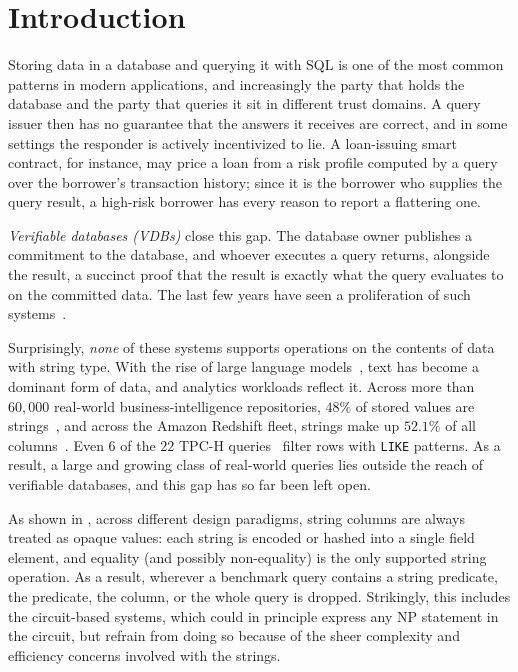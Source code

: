 \doclearpage
\section{Introduction}

Storing data in a database and querying it with SQL is one of the most common patterns in modern applications, and increasingly the party that holds the database and the party that queries it sit in different trust domains. A query issuer then has no guarantee that the answers it receives are correct, and in some settings the responder is actively incentivized to lie. A loan-issuing smart contract, for instance, may price a loan from a risk profile computed by a query over the borrower's transaction history; since it is the borrower who supplies the query result, a high-risk borrower has every reason to report a flattering one.

\emph{Verifiable databases (VDBs)} close this gap. The database owner publishes a commitment to the database, and whoever executes a query returns, alongside the result, a succinct proof that the result is exactly what the query evaluates to on the committed data. The last few years have seen a proliferation of such systems~\cite{ZhangKC15,ZhangGKPP17,GuFN25,posql,qedb,cryptoeprint:2026/1260}.

Surprisingly, \emph{none} of these systems supports operations on the contents of data with string type. With the rise of large language models~\cite{OuyangWJAWMZASRSHKMSAWCLL22,TouvronLIMLLRGHARJGL23}, text has become a dominant form of data, and analytics workloads reflect it. Across more than $60{,}000$ real-world business-intelligence repositories, $48\%$ of stored values are strings~\cite{VogelsgesangHFKLMNT18}, and across the Amazon Redshift fleet, strings make up $52.1\%$ of all columns~\cite{RenenHPVDNLSK24}. Even $6$ of the $22$ TPC-H queries~\cite{PoessF00} filter rows with \texttt{LIKE} patterns.
As a result, a large and growing class of real-world queries lies outside the reach of verifiable databases, and this gap has so far been left open.


As shown in , across different design paradigms, string columns are always treated as opaque values: each string is encoded or hashed into a single field element, and equality (and possibly non-equality) is the only supported string operation. As a result, wherever a benchmark query contains a string predicate, the predicate, the column, or the whole query is dropped. Strikingly, this includes the circuit-based systems, which could in principle express any NP statement in the circuit, but refrain from doing so because of the sheer complexity and efficiency concerns involved with the strings.

